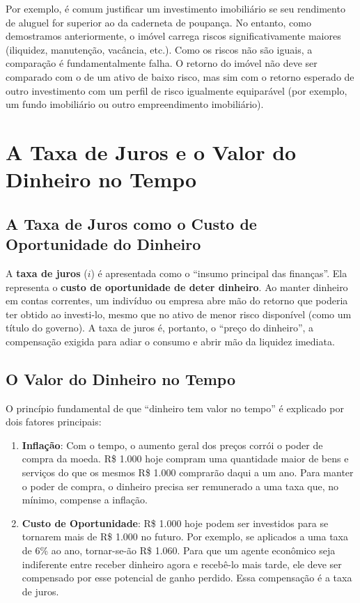 \documentclass[
  a4paper,
]{book}
\providecommand{\tightlist}{%
  \setlength{\itemsep}{0pt}\setlength{\parskip}{0pt}}\usepackage{longtable,booktabs,array}
\begin{document}
Por exemplo, é comum justificar um investimento imobiliário se seu
rendimento de aluguel for superior ao da caderneta de poupança. No
entanto, como demostramos anteriormente, o imóvel carrega riscos
significativamente maiores (iliquidez, manutenção, vacância, etc.). Como
os riscos não são iguais, a comparação é fundamentalmente falha. O
retorno do imóvel não deve ser comparado com o de um ativo de baixo
risco, mas sim com o retorno esperado de outro investimento com um
perfil de risco igualmente equiparável (por exemplo, um fundo
imobiliário ou outro empreendimento imobiliário).

\section{A Taxa de Juros e o Valor do Dinheiro no
Tempo}\label{a-taxa-de-juros-e-o-valor-do-dinheiro-no-tempo}

\subsection{A Taxa de Juros como o Custo de Oportunidade do
Dinheiro}\label{a-taxa-de-juros-como-o-custo-de-oportunidade-do-dinheiro}

A \textbf{taxa de juros} (\(i\)) é apresentada como o ``insumo principal
das finanças''. Ela representa o \textbf{custo de oportunidade de deter
dinheiro}. Ao manter dinheiro em contas correntes, um indivíduo ou
empresa abre mão do retorno que poderia ter obtido ao investi-lo, mesmo
que no ativo de menor risco disponível (como um título do governo). A
taxa de juros é, portanto, o ``preço do dinheiro'', a compensação
exigida para adiar o consumo e abrir mão da liquidez imediata.

\subsection{O Valor do Dinheiro no
Tempo}\label{o-valor-do-dinheiro-no-tempo}

O princípio fundamental de que ``dinheiro tem valor no tempo'' é
explicado por dois fatores principais:

\begin{enumerate}
\def\labelenumi{\arabic{enumi}.}
\tightlist
\item
  \textbf{Inflação}: Com o tempo, o aumento geral dos preços corrói o
  poder de compra da moeda. R\$ 1.000 hoje compram uma quantidade maior
  de bens e serviços do que os mesmos R\$ 1.000 comprarão daqui a um
  ano. Para manter o poder de compra, o dinheiro precisa ser remunerado
  a uma taxa que, no mínimo, compense a inflação.
\item
  \textbf{Custo de Oportunidade}: R\$ 1.000 hoje podem ser investidos
  para se tornarem mais de R\$ 1.000 no futuro. Por exemplo, se
  aplicados a uma taxa de 6\% ao ano, tornar-se-ão R\$ 1.060. Para que
  um agente econômico seja indiferente entre receber dinheiro agora e
  recebê-lo mais tarde, ele deve ser compensado por esse potencial de
  ganho perdido. Essa compensação é a taxa de juros.
\end{enumerate}
\end{document}
